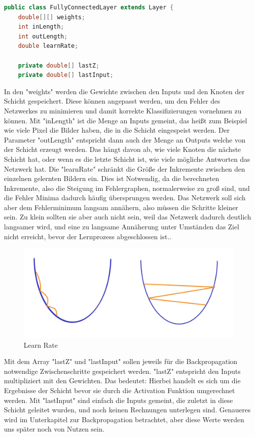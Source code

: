 \documentclass[12pt]{article}
\begin{document}
\begin{lstlisting}[language=Java]
public class FullyConnectedLayer extends Layer {
    double[][] weights;
    int inLength;
    int outLength;
    double learnRate;

    private double[] lastZ;
    private double[] lastInput;
\end{lstlisting} 
In den "weights" werden die Gewichte zwischen den Inputs und den Knoten der Schicht gespeichert. Diese können angepasst werden, um den Fehler des Netzwerkes zu minimieren und damit korrekte Klassifizierungen vornehmen zu können.
Mit "inLength" ist die Menge an Inputs gemeint, das heißt zum Beispiel wie viele Pixel die Bilder haben, die in die Schicht eingespeist werden.
Der Parameter "outLength" entspricht dann auch der Menge an Outputs welche von der Schicht erzeugt werden. Das hängt davon ab, wie viele Knoten die nächste Schicht hat, oder wenn es die letzte Schicht ist, wie viele mögliche Antworten das Netzwerk hat.
Die "learnRate" schränkt die Größe der Inkremente zwischen den einzelnen gelernten Bildern ein. Dies ist Notwendig, da die berechneten Inkremente, also die Steigung im Fehlergraphen, normalerweise zu groß sind, und die Fehler Minima dadurch häufig übersprungen werden. Das Netzwerk soll sich aber dem Fehlerminimum langsam annähern, also müssen die Schritte kleiner sein. Zu klein sollten sie aber auch nicht sein, weil das Netzwerk dadurch deutlich langsamer wird, und eine zu langsame Annäherung unter Umständen das Ziel nicht erreicht, bevor der Lernprozess abgeschlossen ist..


\begin{figure}[H]
\centering
\includegraphics[scale=0.50]{./Images/006_LearnRate.jpg}
\caption{Learn Rate}
\label{Learn Rate}
\end{figure}

Mit dem Array "lastZ" und "lastInput" sollen jeweils für die Backpropagation notwendige Zwischenschritte gespeichert werden. "lastZ" entspricht den Inputs multipliziert mit den Gewichten. Das bedeutet: Hierbei handelt es sich um die Ergebnisse der Schicht bevor sie durch die Activation Funktion umgerechnet werden. Mit "lastInput" sind einfach die Inputs gemeint, die zuletzt in diese Schicht geleitet wurden, und noch keinen Rechnungen unterlegen sind. Genaueres wird im Unterkapitel zur Backpropagation betrachtet, aber diese Werte werden uns später noch von Nutzen sein.
\end{document}
